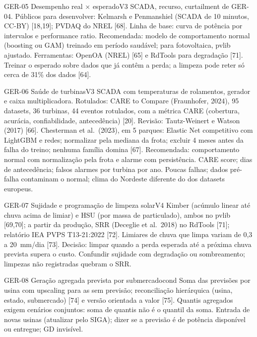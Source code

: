 \begin{ficha}{GER-05 \textperiodcentered{} Desempenho real × esperado}{V3}
 SCADA, recurso, curtailment de GER-04. Públicos para
desenvolver: Kelmarsh e Penmanshiel (SCADA de 10 minutos, CC-BY) [18,19];
PVDAQ do NREL [68].
 Linha de base: curva de potência por intervalos e
performance ratio. Recomendada: modelo de comportamento normal (boosting ou
GAM) treinado em período saudável; para fotovoltaica, pvlib ajustado.
Ferramentas: OpenOA (NREL) [65] e RdTools para degradação [71].
 Treinar o esperado sobre dados que já contêm a perda; a
limpeza pode reter só cerca de 31\% dos dados [64].
\end{ficha}

\begin{ficha}{GER-06 \textperiodcentered{} Saúde de turbinas}{V3}
 SCADA com temperaturas de rolamentos, gerador e caixa
multiplicadora. Rotulados: CARE to Compare (Fraunhofer, 2024), 95 datasets, 36
turbinas, 44 eventos rotulados, com a métrica CARE (cobertura, acurácia,
confiabilidade, antecedência) [20].
 Revisão: Tautz-Weinert e Watson (2017) [66]. Chesterman et
al.\ (2023), em 5 parques: Elastic Net competitivo com LightGBM e redes;
normalizar pela mediana da frota; excluir 4 meses antes da falha do treino;
nenhuma família domina [67]. Recomendada: comportamento normal com
normalização pela frota e alarme com persistência.
 CARE score; dias de antecedência; falsos alarmes por turbina
por ano.
 Poucas falhas; dados pré-falha contaminam o normal; clima
do Nordeste diferente do dos datasets europeus.
\end{ficha}

\begin{ficha}{GER-07 \textperiodcentered{} Sujidade e programação de limpeza solar}{V4}
 Kimber (acúmulo linear até chuva acima de limiar) e HSU
(por massa de particulado), ambos no pvlib [69,70]; a partir da produção, SRR
(Deceglie et al.\ 2018) no RdTools [71]; relatório IEA PVPS T13-21:2022 [72].
Limiares de chuva que limpa variam de 0,3 a 20~mm/dia [73]. Decisão: limpar
quando a perda esperada até a próxima chuva prevista supera o custo.
 Confundir sujidade com degradação ou sombreamento;
limpezas não registradas quebram o SRR.
\end{ficha}

\begin{ficha}{GER-08 \textperiodcentered{} Geração agregada prevista por submercado}{cond}
 Soma das previsões por usina com upscaling para as sem
previsão; reconciliação hierárquica (usina, estado, submercado) [74] e versão
orientada a valor [75]. Quantis agregados exigem cenários conjuntos: soma de
quantis não é o quantil da soma.
 Entrada de novas usinas (atualizar pelo SIGA); dizer se a
previsão é de potência disponível ou entregue; GD invisível.
\end{ficha}


